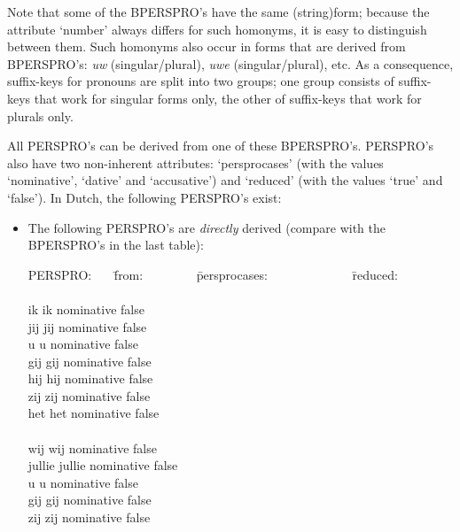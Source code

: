 Note that some of the BPERSPRO's have the same (string)form; because the 
attribute `number' always differs for such homonyms, it is easy to 
distinguish between them. Such homonyms also occur in forms that are derived 
from BPERSPRO's: {\em uw} (singular/plural), {\em uwe} (singular/plural), etc. 
As a 
consequence, suffix-keys for pronouns are split into two groups; one group
consists of suffix-keys that work for singular forms only, the other of
suffix-keys that work for plurals only.

All PERSPRO's can be derived from one of these BPERSPRO's. PERSPRO's also have
two non-inherent attributes: `persprocases' (with the values `nominative', 
`dative' and
`accusative') and `reduced' (with the values `true' and `false'). In Dutch, the
following PERSPRO's exist:

\begin{itemize}
  \item The following PERSPRO's are {\em directly} derived (compare with the 
        BPERSPRO's in the last table):

\begin{tabbing}
PERSPRO: \ \ \  \= from: \ \ \ \ \ \ \ \ \= persprocases: \ \ \ \ \ \ \  
\ \ \ \ \ \  \= reduced: \\
         \>                \>                    \>       \\
ik       \> ik             \> nominative         \> false \\
jij      \> jij            \> nominative         \> false \\
u        \> u              \> nominative         \> false \\
gij      \> gij            \> nominative         \> false \\
hij      \> hij            \> nominative         \> false \\
zij      \> zij            \> nominative         \> false \\
het      \> het            \> nominative         \> false \\
         \>                \>                    \>       \\
wij      \> wij            \> nominative         \> false \\
jullie   \> jullie         \> nominative         \> false \\
u        \> u              \> nominative         \> false \\
gij      \> gij            \> nominative         \> false \\
zij      \> zij            \> nominative         \> false \\
\end{tabbing}


\end{itemize}
